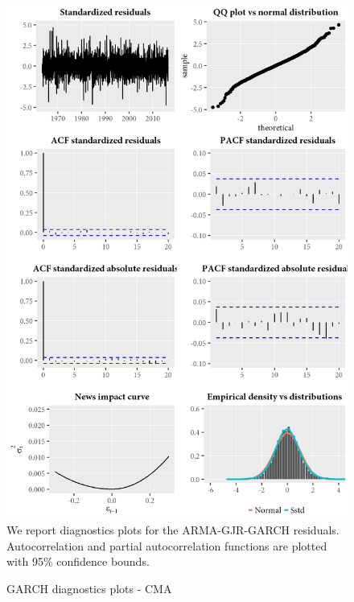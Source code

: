 \begin{figure}[H]
  \caption{GARCH diagnostics plots - CMA}
  \label{diag:garchdiagCMA}
  \toprule
  \centering
  \begin{minipage}{\textwidth}
  \includegraphics[scale=1]{graphics/garch/garch_diagnosticsCMA.png}  
  \bottomrule
  \vspace{3mm}
  \footnotesize
  We report diagnostics plots for the ARMA-GJR-GARCH residuals. Autocorrelation and partial autocorrelation functions are plotted with 95\% confidence bounds.
  \end{minipage}
\end{figure}